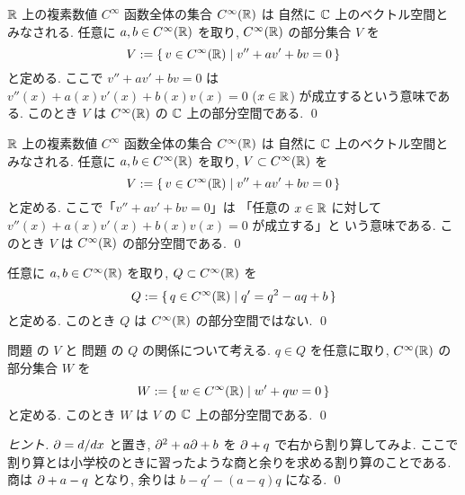 \documentclass[12pt,twoside]{jarticle}
\begin{document}
\begin{question}[5点]
  ${\mathbb R}$ 上の複素数値 $C^\infty$ 函数全体の集合 $C^\infty({\mathbb R})$ は
  自然に ${\mathbb C}$ 上のベクトル空間とみなされる.
  任意に $a,b\in C^\infty({\mathbb R})$ を取り, $C^\infty({\mathbb R})$ の部分集合 $V$ を
  \begin{equation*}
    V := \{\, v\in C^\infty({\mathbb R})
    \mid v''+ av'+ bv = 0 \,\}
  \end{equation*}
  と定める. ここで $v''+ av'+ bv = 0$ は %
  $v''(x)+ a(x)v'(x)+ b(x)v(x) = 0$ ($x\in{\mathbb R}$) が成立するという意味である.
  このとき $V$ は $C^\infty({\mathbb R})$ の ${\mathbb C}$ 上の部分空間である.
  \qed
\end{question}

\begin{question}[二階の線形常微分方程式の解空間, 5点]
  \label{q:ODE-a,b}
  ${\mathbb R}$ 上の複素数値 $C^\infty$ 函数全体の集合 $C^\infty({\mathbb R})$ は
  自然に ${\mathbb C}$ 上のベクトル空間とみなされる.
  任意に $a,b\in C^\infty({\mathbb R})$ を取り, $V\subset C^\infty({\mathbb R})$ を
  \begin{equation*}
    V := \{\, v\in C^\infty({\mathbb R}) \mid v''+ av'+ bv = 0 \,\}
  \end{equation*}
  と定める. ここで「$v''+ av'+ bv = 0$」は %
  「任意の $x\in {\mathbb R}$ に対して $v''(x)+ a(x)v'(x)+ b(x)v(x) = 0$ が成立する」と
  いう意味である. このとき $V$ は $C^\infty({\mathbb R})$ の部分空間である.
  \qed
\end{question}

\begin{question}[Riccati型微分方程式, 5点]
  \label{q:Riccati1}
  任意に $a,b\in C^\infty({\mathbb R})$ を取り, $Q \subset C^\infty({\mathbb R})$ を
  \begin{equation*}
    Q := \{\, q\in C^\infty({\mathbb R}) \mid q' = q^2 - aq + b \,\}
  \end{equation*}
  と定める. このとき $Q$ は $C^\infty({\mathbb R})$ の部分空間ではない.
  \qed
\end{question}

\begin{question}[10点]
  \label{q:Riccati2}
  問題  の $V$ と
  問題  の $Q$ の関係について考える.
  $q\in Q$ を任意に取り, $C^\infty({\mathbb R})$ の部分集合 $W$ を
  \begin{equation*}
    W := \{\, w\in C^\infty({\mathbb R}) \mid w' + qw = 0 \,\}
  \end{equation*}
  と定める. このとき $W$ は $V$ の ${\mathbb C}$ 上の部分空間である.
  \qed
\end{question}

\begin{proof}[ヒント]
  $\partial=d/dx$ と置き, $\partial^2+a\partial+b$ を $\partial+q$ で右から割り算してみよ.
  ここで割り算とは小学校のときに習ったような商と余りを求める割り算のことである.
  商は $\partial+a-q$ となり, 余りは $b-q'-(a-q)q$ になる.
  \qed
\end{proof}
\end{document}

